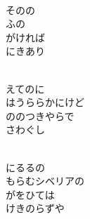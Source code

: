 \documentclass[10pt,b5j]{tarticle} %
\begin{document}
\begin{enumerate}
\begin{minipage}[c]{\blocksize}
    \end{minipage}
    \begin{minipage}[c]{\blocksize}
        
        \vspace{\linespace}
        \item~\\
        そのの\\
        ふの\\
        がければ\\
        にきあり
        
    \end{minipage}
    \begin{minipage}[c]{\blocksize}
        
        \vspace{\linespace}
        \item~\\
        えてのに\\
        はうららかにけど\\
        ののつきやらで\\
        さわぐし
        
    \end{minipage}
    \begin{minipage}[c]{\blocksize}
        
        \vspace{\linespace}
        \item~\\
        にるるの\\
        もらむシベリアの\\
        がをひては\\
        けきのらずや
        
    \end{minipage}
    \begin{minipage}[c]{\blocksize}
        

\end{minipage}
\end{enumerate}
\end{document}
